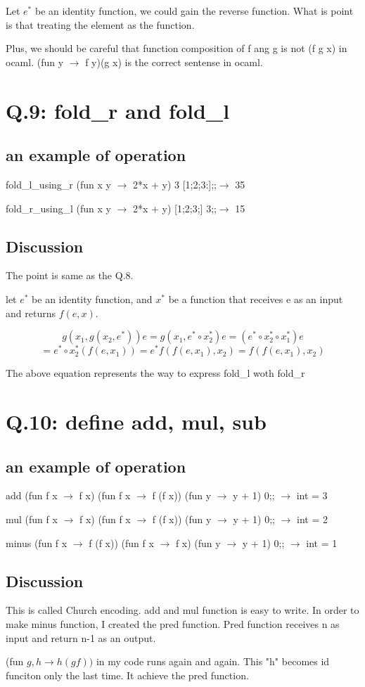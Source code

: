 \documentclass[uplatex,12pt]{jsarticle}
\begin{document}
Let $e^*$ be an identity function, we could gain the reverse function. What is point is that treating the element as the function.

Plus, we should be careful that function composition of f ang g is not (f g x) in ocaml. (fun y $\rightarrow$ f y)(g x) is the correct sentense in ocaml.


\section {Q.9: fold\_r and fold\_l}

\subsection{an example of operation}
fold\_l\_using\_r (fun x y $\rightarrow$ 2*x + y) 3 [1;2;3:];;$\rightarrow$ 35

fold\_r\_using\_l (fun x y $\rightarrow$ 2*x + y) [1;2;3;] 3;;$\rightarrow$ 15

\subsection{Discussion}

The point is same as the Q.8.

let $e^*$ be an identity function, and $x^*$ be a function that receives e as an input and returns $f (e, x)$.

$$g (x_1, g(x_2,e^*))e = g(x_1,e^* \circ x_2^*)e = (e^* \circ x_2^* \circ x_1^*)e $$$$=e^*\circ x_2^*(f(e,x_1)) = e^*f(f(e,x_1),x_2)=f(f(e,x_1),x_2)$$

The above equation represents the way to express fold\_l woth fold\_r


\section {Q.10: define add, mul, sub}

\subsection{an example of operation}
add (fun f x $\rightarrow$ f x) (fun f x $\rightarrow$ f (f x)) (fun y $\rightarrow$ y + 1) 0;; $\rightarrow$ int = 3

mul (fun f x $\rightarrow$ f x) (fun f x $\rightarrow$ f (f x)) (fun y $\rightarrow$ y + 1) 0;; $\rightarrow$ int = 2

minus (fun f x $\rightarrow$ f (f x)) (fun f x $\rightarrow$ f x) (fun y $\rightarrow$ y + 1) 0;; $\rightarrow$ int = 1


\subsection{Discussion}
This is called Church encoding.
add and mul function is easy to write.
In order to make minus function, I created the pred function. Pred function receives n as input and return n-1 as an output.

(fun $ g,h \rightarrow h(g f) )$ in my code runs again and again. This "h" becomes id funciton only the last time. It achieve the pred function.
\end{document}
